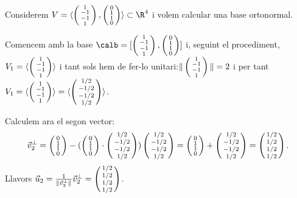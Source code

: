 \begin{exemple}\label{exemple:GramSchmidt}
Considerem $V=\langle \smat{1\\-1\\-1\\1}, \smat{0\\1\\1\\0}\rangle \subset \R^4$ i volem calcular una base ortonormal.

Comencem amb la base $\calb=[\smat{1\\-1\\-1\\1}, \smat{0\\1\\1\\0}]$ i, seguint el procediment, $V_1=\langle \smat{1\\-1\\-1\\1}\rangle$ i tant sols hem de fer-lo unitari:$\|\smat{1\\-1\\-1\\1}\|=2$ i per tant $V_1=\langle \smat{1\\-1\\-1\\1}\rangle=\langle \smat{1/2\\-1/2\\-1/2\\1/2}\rangle$.

Calculem ara el segon vector:
\[
\vec v_2^\perp = \smat{0\\1\\1\\0} - (\smat{0\\1\\1\\0}\cdot\smat{1/2\\-1/2\\-1/2\\1/2})\smat{1/2\\-1/2\\-1/2\\1/2}= \smat{0\\1\\1\\0}+\smat{1/2\\-1/2\\-1/2\\1/2}=\smat{1/2\\1/2\\1/2\\1/2}.
\]
Llavors $\vec u_2=\frac{1}{\|\vec v_2^\perp\|} \vec v_2^\perp=\smat{1/2\\1/2\\1/2\\1/2}$.


\end{exemple}
